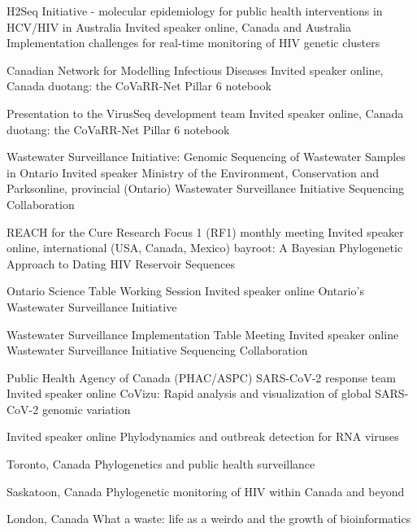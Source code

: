 {H2Seq Initiative - molecular epidemiology for public health interventions in HCV/HIV in Australia}
{Invited speaker}
{}{online, Canada and Australia}
{Implementation challenges for real-time monitoring of HIV genetic clusters}

{Canadian Network for Modelling Infectious Diseases}
{Invited speaker}
{}{online, Canada}
{duotang: the CoVaRR-Net Pillar 6 notebook}

{Presentation to the VirusSeq development team}
{Invited speaker}
{}{online, Canada}
{duotang: the CoVaRR-Net Pillar 6 notebook}

{Wastewater Surveillance Initiative: Genomic Sequencing of Wastewater Samples in Ontario}
{Invited speaker}
{Ministry of the Environment, Conservation and Parks}{online, provincial (Ontario)}
{Wastewater Surveillance Initiative Sequencing Collaboration}

{REACH for the Cure Research Focus 1 (RF1) monthly meeting}
{Invited speaker}
{}{online, international (USA, Canada, Mexico)}
{bayroot: A Bayesian Phylogenetic Approach to Dating HIV Reservoir Sequences}

{Ontario Science Table Working Session}
{Invited speaker}
{}{online}
{Ontario's Wastewater Surveillance Initiative}


{Wastewater Surveillance Implementation Table Meeting}
{Invited speaker}
{}{online}
{Wastewater Surveillance Initiative Sequencing Collaboration}


{Public Health Agency of Canada (PHAC/ASPC) SARS-CoV-2 response team}
{Invited speaker}
{}{online}
{CoVizu: Rapid analysis and visualization of global SARS-CoV-2 genomic variation}

{Invited speaker}
{}{online}
{Phylodynamics and outbreak detection for RNA viruses}

{}{Toronto, Canada}
{Phylogenetics and public health surveillance}

{}{Saskatoon, Canada}
{Phylogenetic monitoring of HIV within Canada and beyond}

{}{London, Canada}
{What a waste: life as a weirdo and the growth of bioinformatics}

